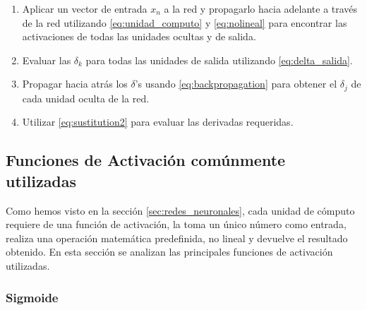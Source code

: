 \documentclass[a4paper,11pt,spanish]{book}
\begin{document}
	\begin{enumerate}
	  \item Aplicar un vector de entrada $x_n$ a la red y  propagarlo hacia adelante a través de la red utilizando \eqref{eq:unidad_computo} y \eqref{eq:nolineal} para encontrar
	  las activaciones de todas las unidades ocultas y de salida.
	  \item Evaluar las $\delta_k$ para todas las unidades de salida utilizando \eqref{eq:delta_salida}.
	  \item Propagar hacia atrás los $\delta$'s usando \eqref{eq:backpropagation} para obtener el $\delta_j$ de cada unidad oculta de la red.
	  \item Utilizar \eqref{eq:sustitution2} para evaluar las derivadas requeridas.
	\end{enumerate}

	\subsection {Funciones de Activación comúnmente utilizadas}
	  Como hemos visto en la sección \ref{sec:redes_neuronales}, cada unidad de cómputo requiere de una función de activación, la toma un único número como entrada, 
	  realiza una operación matemática predefinida, no lineal y devuelve el resultado obtenido. 
	  En esta sección se analizan las principales funciones de activación utilizadas.
	  \subsubsection {Sigmoide}
\end{document}
